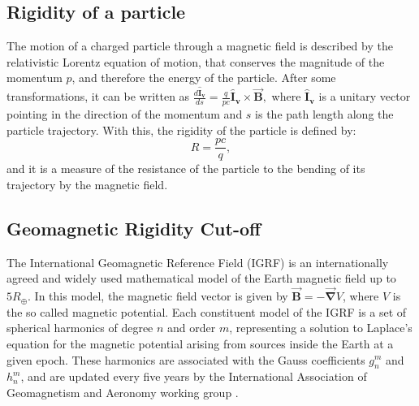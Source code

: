 \documentclass[3p,times,twocolumn]{elsarticle}
\begin{document}
\subsection{Rigidity of a particle} \label{sec:rigidity_particle}

The motion of a charged particle through a magnetic field is described by the
relativistic Lorentz equation of motion, 
that conserves the magnitude of the momentum $p$, and therefore the energy of
the particle. After some transformations, it can be written as 
$
\frac{d\boldsymbol{\hat{I}_v}}{ds}=\frac{q}{pc}\boldsymbol{\hat{I}_v}\times\boldsymbol{\vec{B}},
$
where $\boldsymbol{\hat{I}_v}$ is a unitary vector pointing in the direction of
the momentum and $s$ is the path length along the particle trajectory. With
this, the rigidity of the particle is defined by:
\begin{equation}
R=\frac{pc}{q},
\end{equation}
and it is a measure of the resistance of the particle to the bending of its
trajectory by the magnetic field.

\subsection{Geomagnetic Rigidity Cut-off}\label{sec:Earth_geomagnetic_models}

The International Geomagnetic Reference Field (IGRF)
\cite{susan_macmillan_international_2010} is an internationally agreed and
widely used mathematical model of the Earth magnetic field up to $5 R_\oplus$.
In this model, the magnetic field vector is given by
$\boldsymbol{\vec{B}}=-\boldsymbol{\vec{\nabla}}V$, where $V$
is the so called magnetic potential. Each constituent model of the IGRF is a set of
spherical harmonics of degree $n$ and order $m$, representing a solution to
Laplace's equation for the magnetic potential arising from sources inside the
Earth at a given epoch. These harmonics are associated with the Gauss
coefficients $g_n^m$ and $h_n^m$, and are updated every five years by the
International Association of Geomagnetism and Aeronomy working group
\cite{susan_macmillan_international_2010}.

\end{document}
